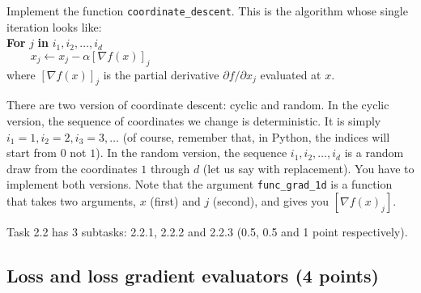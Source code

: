 \documentclass{article}
\begin{document}
Implement the function {\tt coordinate\_descent}. This is the algorithm whose single iteration looks like:\\

\noindent
{\bf For} $j$ {\bf in} $i_1, i_2, \ldots, i_d$ \\
$\phantom{aaaa} x_j \gets x_j - \alpha [\nabla f(x)]_j$\\

\noindent
where $[\nabla f(x)]_j$ is the partial derivative $\partial f/\partial x_j$ evaluated at $x$.

There are two version of coordinate descent: cyclic and random. In the cyclic version, the sequence of coordinates we change is deterministic. It is simply $i_1=1,
i_2=2, i_3=3, \ldots$ (of course, remember that, in Python, the indices will start from $0$ not $1$).
In the random version, the sequence $i_1, i_2, \ldots, i_d$ is a random draw from the coordinates $1$ through $d$ (let us say with replacement). You have to implement
both versions. Note that the argument {\tt func\_grad\_1d} is a function that takes two arguments, $x$ (first) and $j$ (second), and gives you $[\nabla f(x)_j]$.

Task 2.2 has 3 subtasks: 2.2.1, 2.2.2 and 2.2.3 (0.5, 0.5 and 1 point respectively).

\subsection{Loss and loss gradient evaluators (4 points)}
\end{document}
